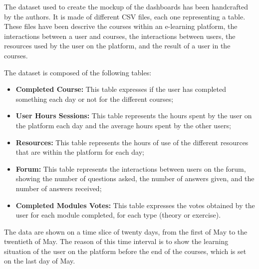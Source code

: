 The dataset used to create the mockup of the dashboards has been handcrafted by the authors.
It is made of different CSV files, each one representing a table. These files have been descrive
the courses within an e-learning platform, the interactions between a user and courses,
the interactions between users, the resources used by the user on the platform, and the result
of a user in the courses.

The dataset is composed of the following tables:
\begin{itemize}
    \item 
        \textbf{Completed Course:} This table expresses if the user has completed something each 
        day or not for the different courses;
    \item 
        \textbf{User Hours Sessions:} This table represents the hours spent by the user on the platform 
        each day and the average hours spent by the other users;
    \item 
        \textbf{Resources:} This table represents the hours of use of the different resources that are
        within the platform for each day;
    \item 
        \textbf{Forum:} This table represents the interactions between users on the forum, showing the number
        of questions asked, the number of answers given, and the number of answers received;
    \item 
        \textbf{Completed Modules Votes:} This table expresses the votes obtained by the user for each module completed, 
        for each type (theory or exercise).
\end{itemize}

The data are shown on a time slice of twenty days, from the first of May to the twentieth of May. The reason of 
this time interval is to show the learning situation of the user on the platform before the end of the courses,
which is set on the last day of May. 

